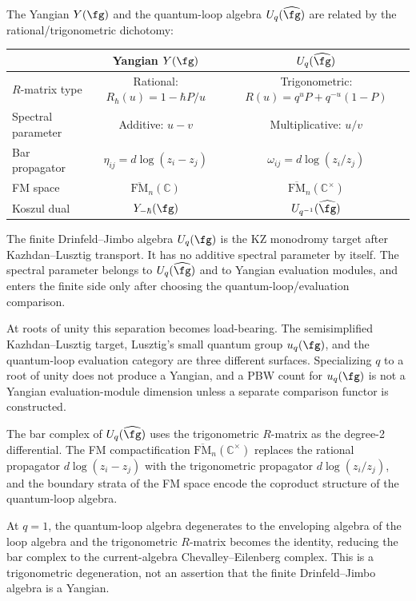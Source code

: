 \begin{remark}
\label{rem:yangian-quantum-group}

The Yangian $Y(\fg)$ and the quantum-loop algebra
$U_q(\widehat{\fg})$ are related by the rational/trigonometric
dichotomy:
\begin{center}
\renewcommand{\arraystretch}{1.2}
\begin{tabular}{l|cc}
& \textbf{Yangian $Y(\fg)$} & \textbf{$U_q(\widehat{\fg})$} \\
\hline
$R$-matrix type & Rational: $R_\hbar(u) = 1-\hbar P/u$ &
Trigonometric: $R(u) = q^{u} P + q^{-u}(1-P)$ \\
Spectral parameter & Additive: $u - v$ & Multiplicative: $u/v$ \\
Bar propagator & $\eta_{ij} = d\log(z_i - z_j)$ &
$\omega_{ij} = d\log(z_i/z_j)$ \\
FM space & $\overline{\mathrm{FM}}_n(\mathbb{C})$ &
$\overline{\mathrm{FM}}_n(\mathbb{C}^\times)$ \\
Koszul dual & $Y_{-\hbar}(\fg)$ & $U_{q^{-1}}(\widehat{\fg})$
\end{tabular}
\end{center}

The finite Drinfeld--Jimbo algebra $U_q(\fg)$ is the KZ monodromy
target after Kazhdan--Lusztig transport. It has no additive spectral
parameter by itself. The spectral parameter belongs to
$U_q(\widehat{\fg})$ and to Yangian evaluation modules, and enters
the finite side only after choosing the quantum-loop/evaluation
comparison.

At roots of unity this separation becomes load-bearing. The
semisimplified Kazhdan--Lusztig target, Lusztig's small quantum group
\(u_q(\fg)\), and the quantum-loop evaluation category are three
different surfaces. Specializing \(q\) to a root of unity does not
produce a Yangian, and a PBW count for \(u_q(\fg)\) is not a Yangian
evaluation-module dimension unless a separate comparison functor is
constructed.

The bar complex of $U_q(\widehat{\fg})$ uses the trigonometric
$R$-matrix as the degree-2 differential. The FM compactification
$\overline{\mathrm{FM}}_n(\mathbb{C}^\times)$ replaces the
rational propagator $d\log(z_i - z_j)$ with the trigonometric
propagator $d\log(z_i/z_j)$, and the boundary strata of the
FM space encode the coproduct structure of the quantum-loop algebra.

At $q = 1$, the quantum-loop algebra degenerates to the enveloping
algebra of the loop algebra and the trigonometric
$R$-matrix becomes the identity, reducing the bar complex to
the current-algebra Chevalley--Eilenberg complex. This is a
trigonometric degeneration, not an assertion that the finite
Drinfeld--Jimbo algebra is a Yangian.
\end{remark}


